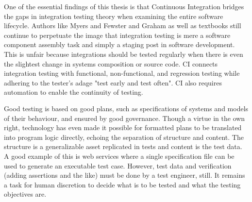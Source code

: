 \documentclass[12pt,a4paper,oneside,pdftex]{report}
\begin{document}
{%
One of the essential findings of this thesis is that Continuous Integration bridges the gaps in integration testing theory when examining the entire software lifecycle. Authors like Myers and Fewster and Graham as well as textbooks \citep{burnstein2003practical} still continue to perpetuate the image that integration testing is mere a software component assembly task and simply a staging post in software development. This is unfair because integrations should be tested regularly when there is even the slightest change in systems composition or source code. CI connects integration testing with functional, non-functional, and regression testing while adhering to the tester's adage "test early and test often". CI also requires automation to enable the continuity of testing.

Good testing is based on good plans, such as specifications of systems and models of their behaviour, and ensured by good governance. Though a virtue in the own right, technology has even made it possible for formatted plans to be translated into program logic directly, echoing the separation of structure and content. The structure is a generalizable asset replicated in tests and content is the test data. A good example of this is web services where a single specification file can be used to generate an executable test case. However, test data and verification (adding assertions and the like) must be done by a test engineer, still. It remains a task for human discretion to decide what is to be tested and what the testing objectives are.


\begin{comment}
Inconsistent interpretation of parameters or values
Violations of value domains or of capacity or size limits
Side-effects on parameters or resrouces
Missing or misunderstood functionality
Nonfinctional problems
Dynamic mismatches
\end{comment}

\begin{comment}
Interpretation
    wrong function - something else than specified
    extra function - more than what is expected/needed
    missing function - not all that is specified
Miscoded call (error which causes the developer to place the call instruction at the wrong point in the program)
    Extra instruction fault: the call instruction is on a path which should not have the call.
    Wrong placement fault: the call is at the wrong location on the path which should have the call instruction.
    Missing instruction fault: the call instruction is missing on the path which should have the call.
Interface error
    When stardards or agreements are violated
\end{comment}

}
\end{document}
